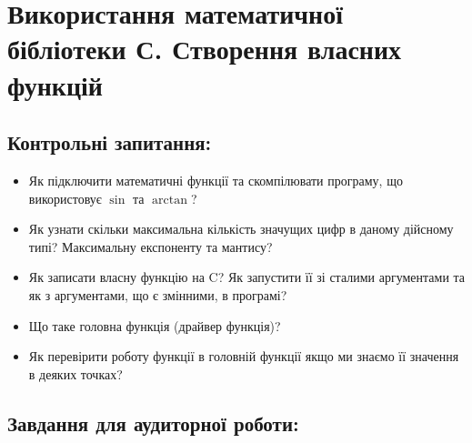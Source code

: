 \documentclass[a5paper,titlepage,openany,twoside,
]
{book_unv}%
\begin{document}
\chapter{ Використання математичної бібліотеки С. Створення власних функцій }
%

\section{Контрольні запитання:}

\begin{itemize}
\item
Як підключити математичні функції та скомпілювати програму, що
використовує $\sin$ та $\arctan$?

\item
Як узнати скільки максимальна кількість значущих цифр в даному
дійсному типі? Максимальну експоненту та мантису?

\item
Як записати власну функцію на C? Як запустити її зі сталими
аргументами та як з аргументами, що є змінними, в програмі?

\item
Що таке головна функція (драйвер функція)?

\item
Як перевірити роботу функції в головній функції якщо ми знаємо
її значення в деяких точках?

\end{itemize}

\section{Завдання для аудиторної роботи:}
\end{document}
